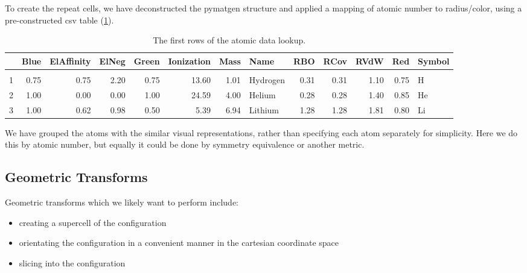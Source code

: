 \documentclass[10pt,parskip=half,
	toc=sectionentrywithdots,
	bibliography=totocnumbered,
	captions=tableheading,numbers=noendperiod]{scrartcl}
\providecommand{\tightlist}{%
  \setlength{\itemsep}{0pt}\setlength{\parskip}{0pt}}
\begin{document}
To create the repeat cells, we have deconstructed the pymatgen structure
and applied a mapping of atomic number to radius/color, using a
pre-constructed csv table (\cref{tbl:atom_map}).

    \begin{table}[H]\caption{The first rows of the atomic data lookup.}\label{tbl:atom_map}

        \centering
		\begin{adjustbox}{max width=\textwidth}
        \begin{tabular}{lrrrrrrlrrrrl}
\toprule
{} &  Blue &  ElAffinity &  ElNeg &  Green &  Ionization &  Mass &      Name &   RBO &  RCov &  RVdW &   Red & Symbol \\
\midrule
  &       &             &        &        &             &       &           &       &       &       &       &        \\
1 &  0.75 &        0.75 &   2.20 &   0.75 &       13.60 &  1.01 &  Hydrogen &  0.31 &  0.31 &  1.10 &  0.75 &      H \\
2 &  1.00 &        0.00 &   0.00 &   1.00 &       24.59 &  4.00 &    Helium &  0.28 &  0.28 &  1.40 &  0.85 &     He \\
3 &  1.00 &        0.62 &   0.98 &   0.50 &        5.39 &  6.94 &   Lithium &  1.28 &  1.28 &  1.81 &  0.80 &     Li \\
\bottomrule
\end{tabular}

		\end{adjustbox}
        \end{table}

We have grouped the atoms with the similar visual representations,
rather than specifying each atom separately for simplicity. Here we do
this by atomic number, but equally it could be done by symmetry
equivalence or another metric.

\subsection{Geometric Transforms}\label{geometric-transforms}

Geometric transforms which we likely want to perform include:

\begin{itemize}
\tightlist
\item
  creating a supercell of the configuration
\item
  orientating the configuration in a convenient manner in the cartesian
  coordinate space
\item
  slicing into the configuration
\end{itemize}
\end{document}
